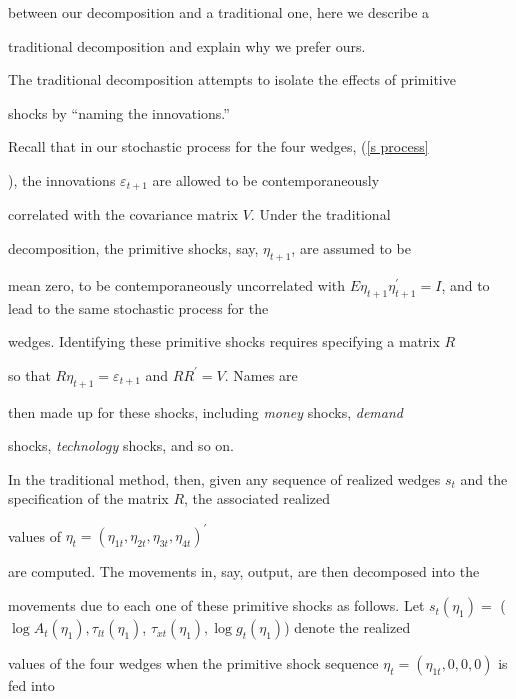 \documentclass[fleqn,leqno,11pt]{article}
\begin{document}
between our decomposition and a traditional one, here we describe a

traditional decomposition and explain why we prefer ours.



The traditional decomposition attempts to isolate the effects of primitive

shocks by \textquotedblleft naming the innovations.\textquotedblright\

Recall that in our stochastic process for the four wedges, (\ref{s process}%

), the innovations $\varepsilon _{t+1}$ are allowed to be contemporaneously

correlated with the covariance matrix $V.$ Under the traditional

decomposition, the primitive shocks, say, $\eta _{t+1}$, are assumed to be

mean zero, to be contemporaneously uncorrelated with $E\eta _{t+1}\eta

_{t+1}^{\prime }=I$, and to lead to the same stochastic process for the

wedges. Identifying these primitive shocks requires specifying a matrix $R$

so that $R\eta _{t+1}=\varepsilon _{t+1}$ and $RR^{\prime }=V.$ Names are

then made up for these shocks, including \emph{money} shocks, \emph{demand}

shocks, \emph{technology} shocks, and so on.



In the traditional method, then, given any sequence of realized wedges $%

s_{t} $ and the specification of the matrix $R$, the associated realized

values of $\eta _{t}=(\eta _{1t},\eta _{2t},\eta _{3t},\eta _{4t})^{\prime }$

are computed. The movements in, say, output, are then decomposed into the

movements due to each one of these primitive shocks as follows. Let $%

s_{t}(\eta _{1})=$ {\large (}$\log A_{t}(\eta _{1}),\tau _{lt}(\eta _{1})$, $%

\tau _{xt}(\eta _{1}),\log g_{t}(\eta _{1})${\large )} denote the realized

values of the four wedges when the primitive shock sequence $\eta _{t}=(\eta

_{1t},0,0,0)$ is fed into 
\end{document}
